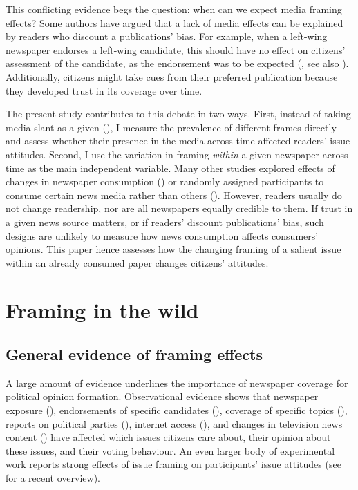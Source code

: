 \documentclass{article}
\begin{document}
This conflicting evidence begs the question: when can we expect media framing effects? Some authors have argued that a lack of media effects can be explained by readers who discount a publications' bias. For example, when a left-wing newspaper endorses a left-wing candidate, this should have no effect on citizens' assessment of the candidate, as the endorsement was to be expected (\cite{Chiang2011a}, see also \cite{Spirig2020}). Additionally, citizens might take cues from their preferred publication because they developed trust in its coverage over time.

The present study contributes to this debate in two ways. First, instead of taking media slant as a given (\cite{Foos2020, Guess2021}), I measure the prevalence of different frames directly and assess whether their presence in the media across time affected readers' issue attitudes. Second, I use the variation in framing \textit{within} a given newspaper across time as the main independent variable. Many other studies explored effects of changes in newspaper consumption (\cite{Foos2020, Gentzkow2011}) or randomly assigned participants to consume certain news media rather than others (\cite{Guess2021}). However, readers usually do not change readership, nor are all newspapers equally credible to them. If trust in a given news source matters, or if readers' discount publications' bias, such designs are unlikely to measure how news consumption affects consumers' opinions. This paper hence assesses how the changing framing of a salient issue within an already consumed paper changes citizens' attitudes. 

\section{Framing in the wild}

\subsection{General evidence of framing effects}

A large amount of evidence underlines the importance of newspaper coverage for political opinion formation. Observational evidence shows that newspaper exposure (\cite{Foos2020, Spirig2020}), endorsements of specific candidates (\cite{Ladd2009a, Chiang2011a}), coverage of specific topics (\cite{King2017}), reports on political parties (\cite{Boomgaarden2009, Devine2020}), internet access (\cite{Schaub2020}), and changes in television news content (\cite{Durante2012}) have affected which issues citizens care about, their opinion about these issues, and their voting behaviour. An even larger body of experimental work reports strong effects of issue framing on participants' issue attitudes (see \cite{Busby2019} for a recent overview).
\end{document}
